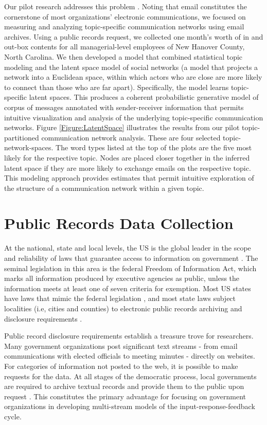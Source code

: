 Our pilot research addresses this problem \cite{Krafft2012}. Noting that email constitutes the cornerstone of most organizations' electronic communications, we focused on measuring and analyzing topic-specific communication networks using email archives. Using a public records request, we collected one month's worth of in and out-box contents for all managerial-level employees of New Hanover County, North Carolina. We then developed a model that combined statistical topic modeling and the latent space model of social networks (a model that projects a network into a Euclidean space, within which actors who are close are more likely to connect than those who are far apart). Specifically, the model learns topic-specific latent spaces. This produces a coherent probabilistic generative model of corpus of messages annotated with sender-receiver information that permits intuitive visualization and analysis of the underlying topic-specific communication networks. Figure
\ref{Figure:LatentSpace} illustrates the results from our pilot
topic-partitioned communication network analysis. These
are four selected topic-network-spaces. The word types listed at the
top of the plots are the five most likely for the respective
topic. Nodes are placed closer together in the inferred latent space
if they are more likely to exchange emails on the respective
topic. This modeling approach provides estimates that permit intuitive
exploration of the structure of a communication network within a given
topic.


\section{Public Records Data Collection}

 At the national, state and local levels, the US is the global leader in the scope and reliability of laws that guarantee access to information on government \cite{Halstuk2006}. The seminal legislation in this area is the federal Freedom of Information Act, which marks all information produced by executive agencies as public, unless the information meets at least one of seven criteria for exemption. Most US states have laws that mimic the federal legislation \cite{Braverman1980}, and most state laws subject localities (i.e, cities and counties) to electronic public records archiving and disclosure requirements \cite{Byrne2010}. 

  Public record disclosure requirements establish a treasure trove for researchers. Many government organizations post significant text streams - from email communications with elected officials to meeting minutes - directly on websites. For categories of information not posted to the web, it is possible to make requests for the data. At all stages of the democratic process, local governments are required to archive textual records and provide them to the public upon request \cite{Byrne2010}. This constitutes the primary advantage for focusing on government organizations in developing multi-stream models of the input-response-feedback cycle.

